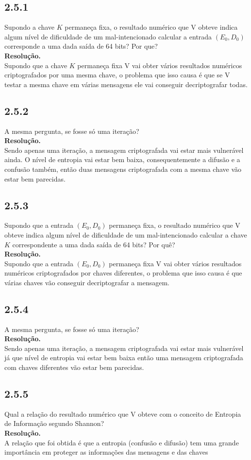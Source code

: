 \documentclass[12pt,letterpaper]{article}
\newcommand\answer{\textbf{Resolução.}\xspace}
\begin{document}
\subsection*{2.5.1}
Supondo a chave $K$ permaneça fixa, o resultado numérico que V obteve indica algum nível de dificuldade de um mal-intencionado calcular a entrada $(E_0,D_0)$ corresponde a uma dada saída de 64 bits? Por que? \\

\answer \\
Supondo que a chave $K$ permaneça fixa V vai obter vários resultados numéricos criptografados por uma mesma chave, o problema que isso causa é que se V testar a mesma chave em várias mensagens ele vai conseguir decriptografar todas.

\subsection*{2.5.2}
A mesma pergunta, se fosse só uma iteração? \\

\answer \\
Sendo apenas uma iteração, a mensagem criptografada vai estar mais vulnerável ainda. O nível de entropia vai estar bem baixa, consequentemente a difusão e a confusão também, então duas mensagens criptografada com a mesma chave vão estar bem parecidas.

\subsection*{2.5.3}
Supondo que a entrada $(E_0,D_0)$ permaneça fixa, o resultado numérico que V obteve indica algum nível de dificuldade de um mal-intencionado calcular a chave $K$ correspondente a uma dada saída de 64 bits? Por quê? \\

\answer \\
Supondo que a entrada $(E_0,D_0)$ permaneça fixa V vai obter vários resultados numéricos criptografados por chaves diferentes, o problema que isso causa é que várias chaves vão conseguir decriptografar a mensagem.

\subsection*{2.5.4}
A mesma pergunta, se fosse só uma iteração? \\

\answer \\
Sendo apenas uma iteração, a mensagem criptografada vai estar mais vulnerável já que nível de entropia vai estar bem baixa então uma mensagem criptografada com chaves diferentes vão estar bem parecidas.

\subsection*{2.5.5}
Qual a relação do resultado numérico que V obteve com o conceito de Entropia de Informação segundo Shannon? \\ 

\answer \\ 
A relação que foi obtida é que a entropia (confusão e difusão) tem uma grande importância em proteger as informações das mensagens e das chaves
\end{document}
